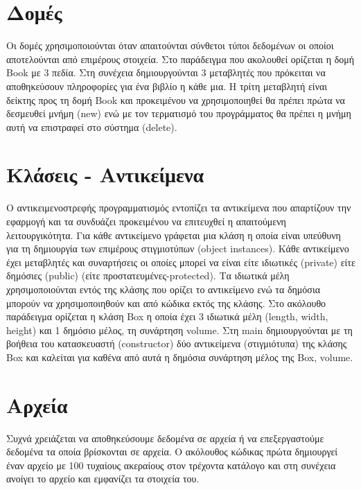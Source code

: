 



\section{Δομές}
Οι δομές χρησιμοποιούνται όταν απαιτούνται σύνθετοι τύποι δεδομένων οι οποίοι αποτελούνται από επιμέρους στοιχεία. Στο παράδειγμα που ακολουθεί ορίζεται η δομή Book με 3 πεδία. Στη συνέχεια δημιουργούνται 3 μεταβλητές που πρόκειται να αποθηκεύσουν πληροφορίες για ένα βιβλίο η κάθε μια.  Η τρίτη μεταβλητή είναι δείκτης προς τη δομή Book και προκειμένου να χρησιμοποιηθεί θα πρέπει πρώτα να δεσμευθεί μνήμη (new) ενώ με τον τερματισμό του προγράμματος θα πρέπει η μνήμη αυτή να επιστραφεί στο σύστημα (delete).





\section{Κλάσεις - Αντικείμενα}
Ο αντικειμενοστρεφής προγραμματισμός εντοπίζει τα αντικείμενα που απαρτίζουν την εφαρμογή και τα συνδυάζει προκειμένου να επιτευχθεί η απαιτούμενη λειτουργικότητα. Για κάθε αντικείμενο γράφεται μια κλάση η οποία είναι υπεύθυνη για τη δημιουργία των επιμέρους στιγμιοτύπων (object instances). Κάθε αντικείμενο έχει μεταβλητές και συναρτήσεις οι οποίες μπορεί να είναι είτε ιδιωτικές (private) είτε δημόσιες (public) (είτε προστατευμένες-protected).  Τα ιδιωτικά μέλη χρησιμοποιούνται εντός της κλάσης που ορίζει το αντικείμενο ενώ τα δημόσια μπορούν να χρησιμοποιηθούν και από κώδικα εκτός της κλάσης. Στο ακόλουθο παράδειγμα ορίζεται η κλάση Box η οποία έχει 3 ιδιωτικά μέλη (length, width, height) και 1 δημόσιο μέλος,  τη συνάρτηση volume. Στη main δημιουργούνται με τη βοήθεια του κατασκευαστή (constructor) δύο αντικείμενα (στιγμιότυπα) της κλάσης Box και καλείται για καθένα από αυτά η δημόσια συνάρτηση μέλος της Box, volume. 





\section{Αρχεία}
Συχνά χρειάζεται να αποθηκεύσουμε δεδομένα σε αρχεία ή να επεξεργαστούμε δεδομένα τα οποία βρίσκονται σε αρχεία. Ο ακόλουθος κώδικας πρώτα δημιουργεί έναν αρχείο με 100 τυχαίους ακεραίους στον τρέχοντα κατάλογο και στη συνέχεια ανοίγει το αρχείο και εμφανίζει τα στοιχεία του.

